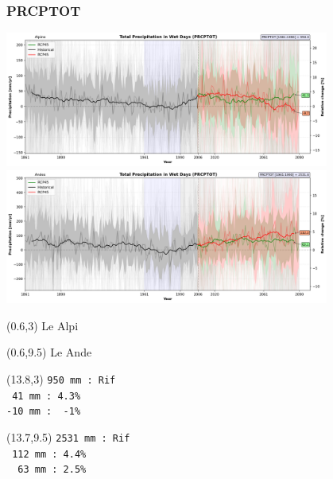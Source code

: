 
\begin{frame}
\frametitle{PRCPTOT}
\begin{center}

{\includegraphics[width=0.8\textwidth]{risultati/prcptot_Alpine_Models_ts}}
{\includegraphics[width=0.8\textwidth]{risultati/prcptot_Andes_Models_ts}}
\end{center}

{
  \scriptsize
  \begin{textblock}{1.8}(0.6,3)
     {\color{gray} Le Alpi}
  \end{textblock}
}


{
  \scriptsize
  \begin{textblock}{1.8}(0.6,9.5)
     {\color{gray} Le Ande}
  \end{textblock}
}

{ \tiny
  \begin{textblock}{3}(13.8,3)
     {\color{CadetBlue}   \texttt{950 mm : Rif}} \\
     {\color{ForestGreen}         \texttt{ 41 mm : 4.3\% }}\\
     {\color{red} \texttt{-10 mm : \ -1\% }}
  \end{textblock}
}

{ \tiny
  \begin{textblock}{3}(13.7,9.5)
     {\color{CadetBlue}   \texttt{2531 mm : Rif}} \\
     {\color{red}         \texttt{ 112  mm : 4.4\% }} \\
     {\color{ForestGreen} \texttt{ \ 63  mm : 2.5\%  }}
  \end{textblock}
}

\end{frame}

%
